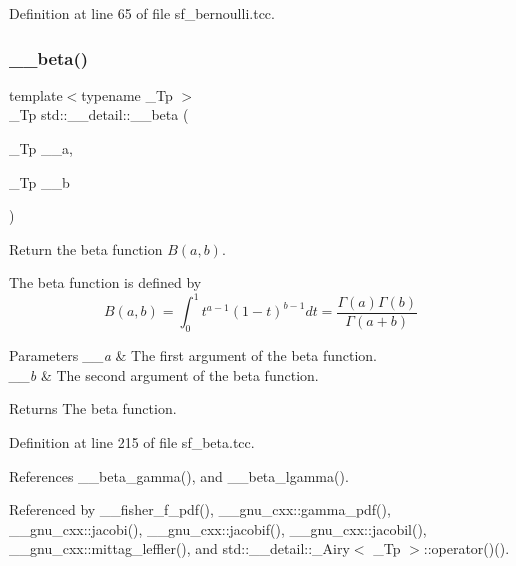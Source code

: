 Definition at line 65 of file sf\+\_\+bernoulli.\+tcc.

\mbox{\label{namespacestd_1_1____detail_a090d2f0920e0d208c467609b2a81d717}} 
\subsubsection{\texorpdfstring{\+\_\+\+\_\+beta()}{\_\_beta()}}
{\footnotesize\ttfamily template$<$typename \+\_\+\+Tp $>$ \\
\+\_\+\+Tp std\+::\+\_\+\+\_\+detail\+::\+\_\+\+\_\+beta (\begin{DoxyParamCaption}\item[{\+\_\+\+Tp}]{\+\_\+\+\_\+a,  }\item[{\+\_\+\+Tp}]{\+\_\+\+\_\+b }\end{DoxyParamCaption})}



Return the beta function $ B(a,b) $. 

The beta function is defined by \[ B(a,b) = \int_0^1 t^{a - 1} (1 - t)^{b - 1} dt = \frac{\Gamma(a)\Gamma(b)}{\Gamma(a+b)} \]


\begin{DoxyParams}{Parameters}
{\em \+\_\+\+\_\+a} & The first argument of the beta function. \\
\hline
{\em \+\_\+\+\_\+b} & The second argument of the beta function. \\
\hline
\end{DoxyParams}
\begin{DoxyReturn}{Returns}
The beta function. 
\end{DoxyReturn}


Definition at line 215 of file sf\+\_\+beta.\+tcc.



References \+\_\+\+\_\+beta\+\_\+gamma(), and \+\_\+\+\_\+beta\+\_\+lgamma().



Referenced by \+\_\+\+\_\+fisher\+\_\+f\+\_\+pdf(), \+\_\+\+\_\+gnu\+\_\+cxx\+::gamma\+\_\+pdf(), \+\_\+\+\_\+gnu\+\_\+cxx\+::jacobi(), \+\_\+\+\_\+gnu\+\_\+cxx\+::jacobif(), \+\_\+\+\_\+gnu\+\_\+cxx\+::jacobil(), \+\_\+\+\_\+gnu\+\_\+cxx\+::mittag\+\_\+leffler(), and std\+::\+\_\+\+\_\+detail\+::\+\_\+\+Airy$<$ \+\_\+\+Tp $>$\+::operator()().

